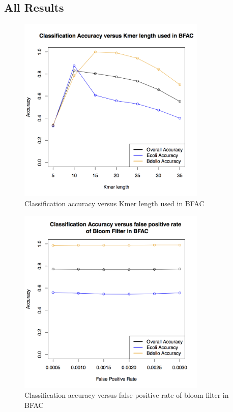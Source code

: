 \documentclass[12pt]{article} %
\begin{document}
\subsection{All Results}
\begin{figure}
\centering
\includegraphics[width=0.8\textwidth]{KmerLength.png}
\caption{Classification accuracy versus Kmer length used in BFAC}
\label{fig: kmer}
\end{figure}

\begin{figure}
\centering
\includegraphics[width=0.8\textwidth]{FlaseDiscoveryRate.png}
\caption{Classification accuracy versus false positive rate of bloom filter in BFAC}
\label{fig: false}
\end{figure}
\end{document}
